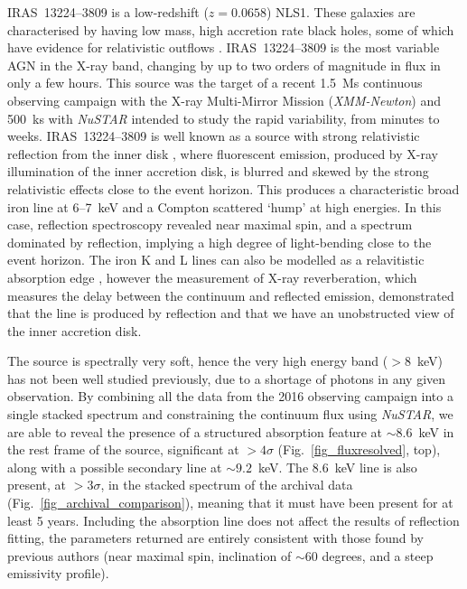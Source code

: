 \documentclass[10pt, a4paper]{article}
\newcommand{\nustar}{\textit{NuSTAR}}
\newcommand{\xmm}{{\it XMM-Newton}}
\begin{document}
IRAS~13224--3809 is a low-redshift ($z=0.0658$) NLS1. These galaxies are characterised by having low mass, high accretion rate black holes\cite{Mathur00}, some of which have evidence for relativistic outflows \cite{Longinotti15}. IRAS~13224--3809 is the most variable AGN in the X-ray band\cite{Ponti12}, changing by up to two orders of magnitude in flux in only a few hours. This source was the target of a recent 1.5~Ms continuous observing campaign with the X-ray Multi-Mirror Mission (\xmm \cite{Jansen01}) and 500~ks with \nustar \cite{Harrison13} intended to study the rapid variability, from minutes to weeks. IRAS~13224--3809 is well known as a source with strong relativistic reflection from the inner disk \cite{Fabian13}, where fluorescent emission, produced by X-ray illumination of the inner accretion disk, is blurred and skewed by the strong relativistic effects close to the event horizon. This produces a characteristic broad iron line at 6--7~keV and a Compton scattered `hump' at high energies. In this case, reflection spectroscopy revealed near maximal spin, and a spectrum dominated by reflection, implying a high degree of light-bending close to the event horizon. The iron K and L lines can also be modelled as a relavitistic absorption edge \cite{Leighly97,Boller03}, however the measurement of X-ray reverberation, which measures the delay between the continuum and reflected emission\cite{Kara13}, demonstrated that the line is produced by reflection and that we have an unobstructed view of the inner accretion disk.


The source is spectrally very soft, hence the very high energy band ($>8$~keV) has not been well studied previously, due to a shortage of photons in any given observation. By combining all the data from the 2016 observing campaign into a single stacked spectrum and constraining the continuum flux using \nustar , we are able to reveal the presence of a structured absorption feature at $\sim8.6$~keV in the rest frame of the source, significant at $>4\sigma$ (Fig.~\ref{fig_fluxresolved}, top), along with a possible secondary line at $\sim9.2$~keV. The 8.6~keV line is also present, at $>3\sigma$, in the stacked spectrum of the archival data (Fig.~\ref{fig_archival_comparison}), meaning that it must have been present for at least 5 years. Including the absorption line does not affect the results of reflection fitting, the parameters returned are entirely consistent with those found by previous authors\cite{Fabian13,Chiang15} (near maximal spin, inclination of $\sim60$ degrees, and a steep emissivity profile). 
\end{document}

